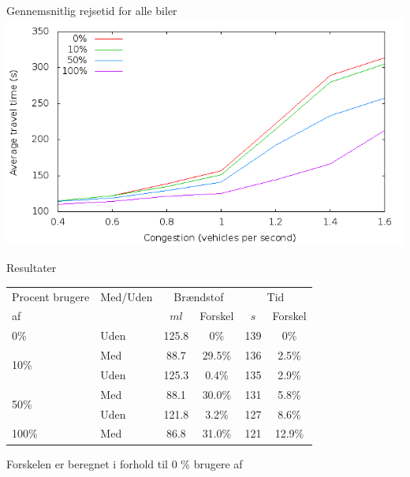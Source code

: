 \begin{frame}{Gennemsnitlig rejsetid for alle biler}
\includegraphics[width=1\textwidth]{../images/timeCongestion.png}
\end{frame}


\begin{frame}{Resultater}

\centering
\begin{tabular}{|l|l|cc|cc|}\hline
Procent brugere			& Med/Uden & \multicolumn{2}{c|}{Brændstof} 	& \multicolumn{2}{c|}{Tid}\\
af \tech				&\tech		& $ml$		& Forskel			&	$s$	& Forskel\\\hline
\multirow{1}{*}{0\%}	& Uden	&	125.8	&	0\%			&	139 & 0\%		\\\hline
\multirow{2}{*}{10\%}	& Med 		&	88.7	&	29.5\%		&	136 & 2.5\%		\\
						& Uden 	&	125.3	&	0.4\%		&	135 & 2.9\%		\\\hline
\multirow{2}{*}{50\%}	& Med		&	88.1	&	30.0\%		&	131 & 5.8\%		\\
						& Uden	&	121.8	&	3.2\%		&	127 & 8.6\%		\\\hline
\multirow{1}{*}{100\%}	& Med		&	86.8	&	31.0\%		&	121 & 12.9\%	\\\hline
\end{tabular}

\vspace{2mm}
Forskelen er beregnet i forhold til 0 \% brugere af \tech
\label{tb:TestResults:total}
\end{frame}